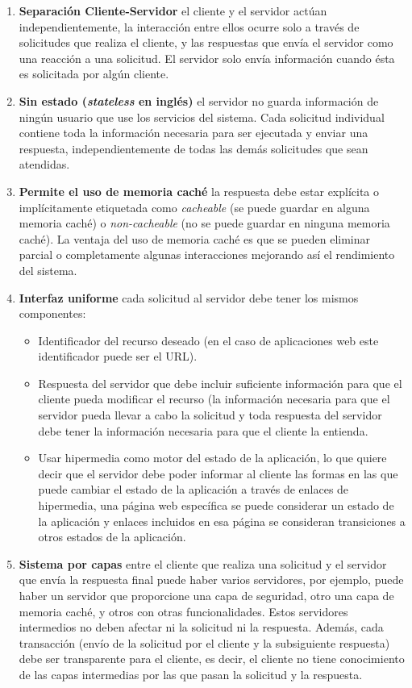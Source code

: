 \begin{enumerate}
   \item \textbf{Separación Cliente-Servidor} el cliente y el servidor actúan independientemente, la interacción entre ellos ocurre solo a través de solicitudes que realiza el cliente, y las respuestas que envía el servidor como una reacción a una solicitud. El servidor solo envía información cuando ésta es solicitada por algún cliente.
   \item \textbf{Sin estado (\emph{stateless} en inglés)} el servidor no guarda información de ningún usuario que use los servicios del sistema. Cada solicitud individual contiene toda la información necesaria para ser ejecutada y enviar una respuesta, independientemente de todas las demás solicitudes que sean atendidas.
   \item \textbf{Permite el uso de memoria caché} la respuesta debe estar explícita o implícitamente etiquetada como \textit{cacheable} (se puede guardar en alguna memoria caché) o \textit{non-cacheable} (no se puede guardar en ninguna memoria caché). La ventaja del uso de memoria caché es que se pueden eliminar parcial o completamente algunas interacciones mejorando así el rendimiento del sistema.
   \item \textbf{Interfaz uniforme} cada solicitud al servidor debe tener los mismos componentes:
        \begin{itemize}
            \item Identificador del recurso deseado (en el caso de aplicaciones web este identificador puede ser el URL).
            \item Respuesta del servidor que debe incluir suficiente información para que el cliente pueda modificar el recurso (la información necesaria para que el servidor pueda llevar a cabo la solicitud y toda respuesta del servidor debe tener la información necesaria para que el cliente la entienda.
            \item Usar hipermedia como motor del estado de la aplicación, lo que quiere decir que el servidor debe poder informar al cliente las formas en las que puede cambiar el estado de la aplicación a través de enlaces de hipermedia, una página web específica se puede considerar un estado de la aplicación y enlaces incluidos en esa página se consideran transiciones a otros estados de la aplicación.
        \end{itemize}
    \item \textbf{Sistema por capas} entre el cliente que realiza una solicitud y el servidor que envía la respuesta final puede haber varios servidores, por ejemplo, puede haber un servidor que proporcione una capa de seguridad, otro una capa de memoria caché, y otros con otras funcionalidades. Estos servidores intermedios no deben afectar ni la solicitud ni la respuesta. Además, cada transacción (envío de la solicitud por el cliente y la subsiguiente respuesta) debe ser transparente para el cliente, es decir, el cliente no tiene conocimiento de las capas intermedias por las que pasan la solicitud y la respuesta.
\end{enumerate}


